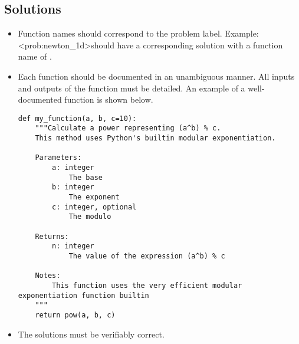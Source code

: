 \subsection{Solutions}
\begin{itemize}
\item Function names should correspond to the problem label.
Example: \textless prob:newton\_1d\textgreater should have a corresponding solution with a function name of .
\item Each function should be documented in an unambiguous manner.
All inputs and outputs of the function must be detailed.
An example of a well-documented function is shown below.
\begin{lstlisting}
def my_function(a, b, c=10):
    """Calculate a power representing (a^b) % c.
    This method uses Python's builtin modular exponentiation.
    
    Parameters:
        a: integer
            The base
        b: integer
            The exponent
        c: integer, optional
            The modulo
            
    Returns:
        n: integer
            The value of the expression (a^b) % c
            
    Notes:
        This function uses the very efficient modular exponentiation function builtin
    """
    return pow(a, b, c)
\end{lstlisting}
\item The solutions must be verifiably correct.
\end{itemize}




